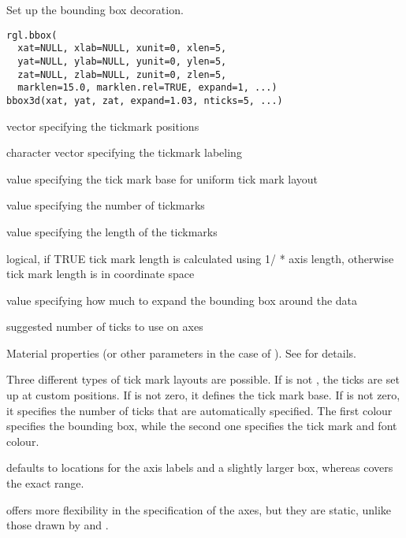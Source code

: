 \begin{Description}\relax
Set up the bounding box decoration.
\end{Description}
\begin{Usage}
\begin{verbatim}
rgl.bbox( 
  xat=NULL, xlab=NULL, xunit=0, xlen=5, 
  yat=NULL, ylab=NULL, yunit=0, ylen=5,
  zat=NULL, zlab=NULL, zunit=0, zlen=5,
  marklen=15.0, marklen.rel=TRUE, expand=1, ...)
bbox3d(xat, yat, zat, expand=1.03, nticks=5, ...)  
\end{verbatim}
\end{Usage}
\begin{Arguments}
\begin{ldescription}
\item[\code{xat,yat,zat}] vector specifying the tickmark positions
\item[\code{xlab,ylab,zlab}] character vector specifying the tickmark labeling
\item[\code{xunit,yunit,zunit}] value specifying the tick mark base for uniform tick mark layout
\item[\code{xlen,ylen,zlen}] value specifying the number of tickmarks
\item[\code{marklen}] value specifying the length of the tickmarks
\item[\code{marklen.rel}] logical, if TRUE tick mark length is calculated using 1/ * axis length, otherwise tick mark length is  in coordinate space
\item[\code{expand}] value specifying how much to expand the bounding box around the data
\item[\code{nticks}] suggested number of ticks to use on axes
\item[\code{ ... }] Material properties (or other  parameters
in the case of ). See  for details.
\end{ldescription}
\end{Arguments}
\begin{Details}\relax
Three different types of tick mark layouts are possible.
If  is not , the ticks are set up at custom positions.
If  is not zero, it defines the tick mark base.
If  is not zero, it specifies the number of ticks that are automatically specified.
The first colour specifies the bounding box, while the second one specifies the tick mark and font colour.

 defaults to  locations for the axis labels and a slightly larger
box, whereas  covers the exact range.

 offers more flexibility in the specification of the axes, but 
they are static, unlike those drawn by  and .
\end{Details}
